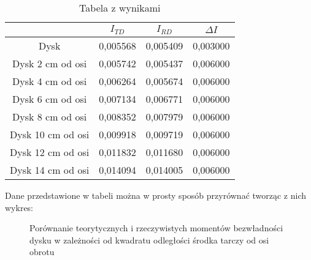 \documentclass[10pt,a4paper]{article}
\begin{document}
\begin{table}[!h]
\centering
\begin{tabular}{|c||c|c|c|}
\hline	
 & $I_{TD}$ & $I_{RD}$ & $\Delta I$\\
\hline
\hline
Dysk& 0,005568&	0,005409&	0,003000\\
\hline
Dysk 2 cm od osi & 0,005742&	0,005437&	0,006000\\
\hline
Dysk 4 cm od osi & 0,006264&	0,005674&	0,006000\\
\hline
Dysk 6 cm od osi & 0,007134&	0,006771&	0,006000\\
\hline
Dysk 8 cm od osi & 0,008352&	0,007979&	0,006000\\
\hline
Dysk 10 cm od osi & 0,009918&	0,009719&	0,006000\\
\hline
Dysk 12 cm od osi & 0,011832&	0,011680&	0,006000\\
\hline
Dysk 14 cm od osi & 0,014094&	0,014005&	0,006000\\
\hline
\end{tabular}
\caption{Tabela z wynikami}
\end{table}

Dane przedstawione w tabeli można w prosty sposób przyrównać tworząc z nich wykres:

\begin{figure}[!h]
\centering
{}
\caption{Porównanie teorytycznych i rzeczywistych momentów bezwładności dysku w zależności od kwadratu odległości środka tarczy od osi obrotu}
\label{fig:wyk}
\end{figure}
\end{document}

